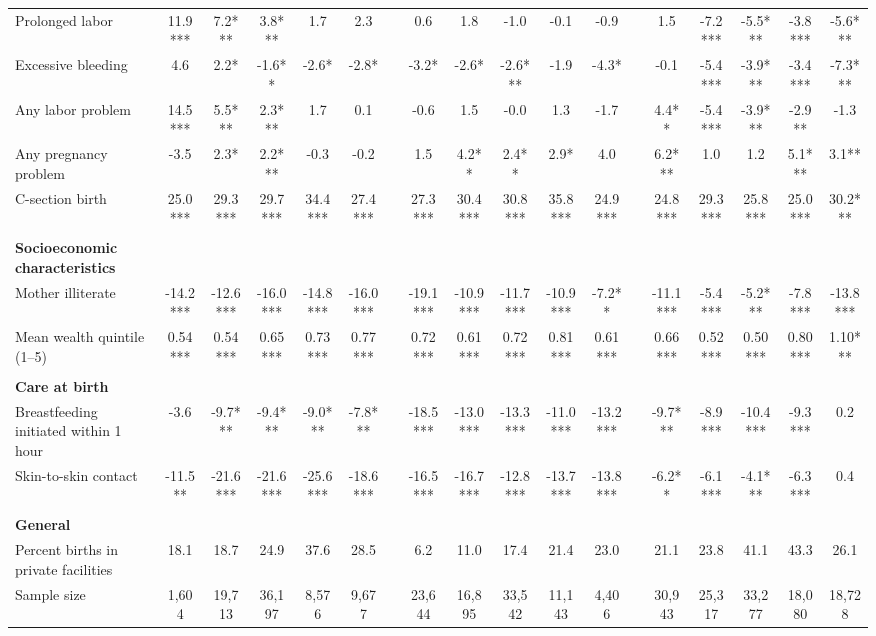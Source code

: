 \begin{tabular}{l*{5}{c}@{\hspace{1.4em}}c@{\hspace{1.4em}}*{5}{c}@{\hspace{1.4em}}c@{\hspace{1.4em}}*{5}{c}}
\hspace*{2em}Prolonged labor&11.9***&7.2***&3.8***&1.7&2.3&&0.6&1.8&-1.0&-0.1&-0.9&&1.5&-7.2***&-5.5***&-3.8***&-5.6***\\
\hspace*{2em}Excessive bleeding&4.6&2.2*&-1.6**&-2.6*&-2.8*&&-3.2*&-2.6*&-2.6***&-1.9&-4.3*&&-0.1&-5.4***&-3.9***&-3.4***&-7.3***\\
\hspace*{2em}Any labor problem&14.5***&5.5***&2.3***&1.7&0.1&&-0.6&1.5&-0.0&1.3&-1.7&&4.4**&-5.4***&-3.9***&-2.9**&-1.3\\
\hspace*{2em}Any pregnancy problem&-3.5&2.3*&2.2***&-0.3&-0.2&&1.5&4.2**&2.4**&2.9*&4.0&&6.2***&1.0&1.2&5.1***&3.1**\\
\hspace*{2em}C-section birth&25.0***&29.3***&29.7***&34.4***&27.4***&&27.3***&30.4***&30.8***&35.8***&24.9***&&24.8***&29.3***&25.8***&25.0***&30.2***\\
&&&&&&&&&&&&&&&&&\\
\textbf{Socioeconomic characteristics}&&&&&&&&&&&&&&&&&\\
\hspace*{2em}Mother illiterate&-14.2***&-12.6***&-16.0***&-14.8***&-16.0***&&-19.1***&-10.9***&-11.7***&-10.9***&-7.2**&&-11.1***&-5.4***&-5.2***&-7.8***&-13.8***\\
\hspace*{2em}Mean wealth quintile (1--5)&0.54***&0.54***&0.65***&0.73***&0.77***&&0.72***&0.61***&0.72***&0.81***&0.61***&&0.66***&0.52***&0.50***&0.80***&1.10***\\
&&&&&&&&&&&&&&&&&\\
\textbf{Care at birth}&&&&&&&&&&&&&&&&&\\
\hspace*{2em}Breastfeeding initiated within 1 hour&-3.6&-9.7***&-9.4***&-9.0***&-7.8***&&-18.5***&-13.0***&-13.3***&-11.0***&-13.2***&&-9.7***&-8.9***&-10.4***&-9.3***&0.2\\
\hspace*{2em}Skin-to-skin contact&-11.5**&-21.6***&-21.6***&-25.6***&-18.6***&&-16.5***&-16.7***&-12.8***&-13.7***&-13.8***&&-6.2**&-6.1***&-4.1***&-6.3***&0.4\\
&&&&&&&&&&&&&&&&&\\
\textbf{General}&&&&&&&&&&&&&&&&&\\
\hspace*{2em}Percent births in private facilities&18.1&18.7&24.9&37.6&28.5&&6.2&11.0&17.4&21.4&23.0&&21.1&23.8&41.1&43.3&26.1\\
\hspace*{2em}Sample size&1,604&19,713&36,197&8,576&9,677&&23,644&16,895&33,542&11,143&4,406&&30,943&25,317&33,277&18,080&18,728\\
\bottomrule
\end{tabular}
